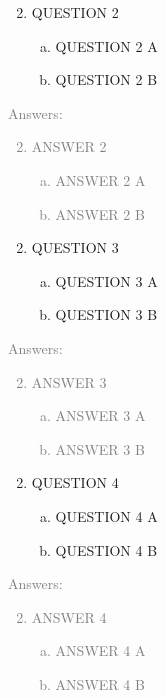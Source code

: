 \documentclass[11pt]{article}
\begin{document}
\begin{enumerate}
	\setcounter{enumi}{1}
	\item QUESTION 2
	\begin{enumerate}[(a)]
		\item QUESTION  2 A
		\item QUESTION  2 B  
	\end{enumerate}
\end{enumerate}
\textcolor{gray}{
Answers:
\begin{enumerate}
	\setcounter{enumi}{1}
	\item ANSWER  2 
	\begin{enumerate}[(a)]
		\item ANSWER  2 A
		\item ANSWER  2 B  
	\end{enumerate}
\end{enumerate}
}

\begin{enumerate}
	\setcounter{enumi}{1}
	\item QUESTION 3
	\begin{enumerate}[(a)]
		\item QUESTION  3 A
		\item QUESTION  3 B  
	\end{enumerate}
\end{enumerate}
\textcolor{gray}{
Answers:
\begin{enumerate}
	\setcounter{enumi}{1}
	\item ANSWER  3 
	\begin{enumerate}[(a)]
		\item ANSWER  3 A
		\item ANSWER  3 B  
	\end{enumerate}
\end{enumerate}
}

\begin{enumerate}
	\setcounter{enumi}{1}
	\item QUESTION 4
	\begin{enumerate}[(a)]
		\item QUESTION  4 A
		\item QUESTION  4 B  
	\end{enumerate}
\end{enumerate}
\textcolor{gray}{
Answers:
\begin{enumerate}
	\setcounter{enumi}{1}
	\item ANSWER  4 
	\begin{enumerate}[(a)]
		\item ANSWER  4 A
		\item ANSWER  4 B  
	\end{enumerate}
\end{enumerate}
}
\end{document}
